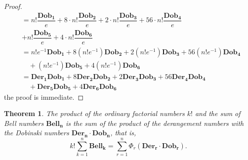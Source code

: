 \documentclass[pdflatex,sn-mathphys-num]{sn-jnl}%
\newtheorem{theorem}{Theorem}
\theoremstyle{thmstyleone}%
\theoremstyle{thmstyletwo}%
\theoremstyle{thmstylethree}%
\begin{document}
\begin{proof}
\begin{align*}
   &=  n!\dfrac{\mathbf{Dob_1} }{e} + 8\cdotp n!\dfrac{\mathbf{Dob_2}}{e} +2\cdotp n!\dfrac{\mathbf{Dob_3}}{e}+ 56\cdotp n!\dfrac{\mathbf{Dob_4}}{e}\\
  & + n!\dfrac{\mathbf{Dob_5}}{e}+ 4\cdotp n!\dfrac{\mathbf{Dob_6}}{e}\\
   &= n!e^{-1}\mathbf{Dob_1} + 8(n!e^{-1})\mathbf{Dob_2} + 2(n!e^{-1})\mathbf{Dob_3} + 56(n!e^{-1})\mathbf{Dob_4} \\
  & \quad + (n!e^{-1})\mathbf{Dob_5}+ 4(n!e^{-1})\mathbf{Dob_6}\\
   &= \mathbf{Der_1} \mathbf{Dob_1} + 8\mathbf{Der_2} \mathbf{Dob_2} + 2 \mathbf{Der_3} \mathbf{Dob_3} +56 \mathbf{Der_4} \mathbf{Dob_4} \\ 
  &\quad+ \mathbf{Der_5} \mathbf{Dob_5}+ 4 \mathbf{Der_6} \mathbf{Dob_6}
    \end{align*}
the proof is immediate.
\end{proof}

\begin{theorem}\label{nine}
    The product of the ordinary factorial numbers $k!$ and the sum of Bell numbers $\mathbf{Bell_n}$ is the sum of the product of the derangement numbers with the Dobinski numbers $\mathbf{Der_n \cdotp Dob_n}$, that is,
    $$ k! \sum_{k=1}^{n}  \mathbf{Bell_k}=\sum_{r=1}^{n} \Phi_r(\mathbf{Der_r \cdotp Dob_r}).$$
\end{theorem}
\end{document}
